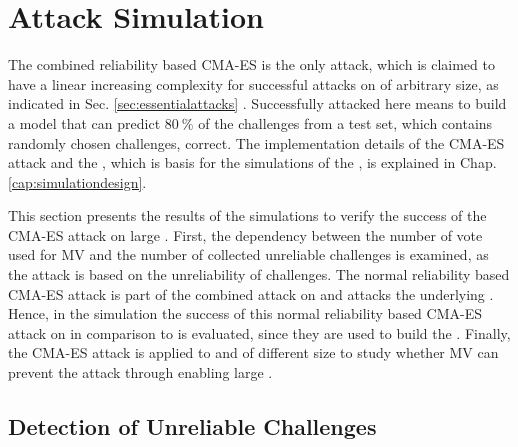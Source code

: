\chapter{Attack Simulation}
\label{cap:attacksimulations}

The combined reliability based \ac{CMA-ES} is the only attack, which is claimed to have a linear increasing complexity for successful attacks on \xpufs of arbitrary size, as indicated in Sec. \ref{sec:essentialattacks} \cite{Becker2015ThePUFs}.
Successfully attacked here means to build a model that can predict $80\ \%$ of the challenges from a test set, which contains randomly chosen challenges, correct.
The implementation details of the \ac{CMA-ES} attack and the \apuf, which is basis for the simulations of the \mpuf, is explained in Chap. \ref{cap:simulationdesign}.

This section presents the results of the simulations to verify the success of the \ac{CMA-ES} attack on large \xpufs.
First, the dependency between the number of vote used for \ac{MV} and the number of collected unreliable challenges is examined, as the attack is based on the unreliability of challenges.
The normal reliability based \ac{CMA-ES} attack is part of the combined attack on \mxpufs and attacks the underlying \mpufs.
Hence, in the simulation the success of this normal reliability based \ac{CMA-ES} attack on \mpufs in comparison to \apufs is evaluated, since they are used to build the \mxpuf.
Finally, the \ac{CMA-ES} attack is applied to \xpufs and \mxpufs of different size to study whether \ac{MV} can prevent the attack through enabling large \mxpufs. 


\section{Detection of Unreliable Challenges}
\label{sec:detectionofunreliablechallenges}

